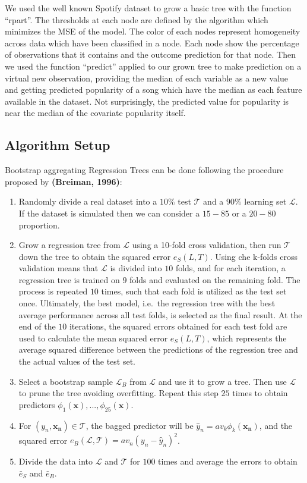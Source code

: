 \documentclass[
]{article}
\begin{document}
We used the well known Spotify dataset to grow a basic tree with the
function ``rpart''. The thresholds at each node are defined by the
algorithm which minimizes the MSE of the model. The color of each nodes
represent homogeneity across data which have been classified in a node.
Each node show the percentage of observations that it contains and the
outcome prediction for that node. Then we used the function ``predict''
applied to our grown tree to make prediction on a virtual new
observation, providing the median of each variable as a new value and
getting predicted popularity of a song which have the median as each
feature available in the dataset. Not surprisingly, the predicted value
for popularity is near the median of the covariate popularity itself.

\hypertarget{algorithm-setup}{%
\subsection{Algorithm Setup}\label{algorithm-setup}}

Bootstrap aggregating Regression Trees can be done following the
procedure proposed by \textbf{(Breiman, 1996)}:

\begin{enumerate}
\def\labelenumi{\arabic{enumi}.}
\item
  Randomly divide a real dataset into a \(10\%\) test \(\mathcal{T}\)
  and a \(90\%\) learning set \(\mathcal{L}\). If the dataset is
  simulated then we can consider a \(15-85\) or a \(20-80\) proportion.
\item
  Grow a regression tree from \(\mathcal{L}\) using a 10-fold cross
  validation, then run \(\mathcal{T}\) down the tree to obtain the
  squared error \(e_S(L, T)\). Using che k-folds cross validation means
  that \(\mathcal{L}\) is divided into \(10\) folds, and for each
  iteration, a regression tree is trained on \(9\) folds and evaluated
  on the remaining fold. The process is repeated \(10\) times, such that
  each fold is utilized as the test set once. Ultimately, the best
  model, i.e.~the regression tree with the best average performance
  across all test folds, is selected as the final result. At the end of
  the \(10\) iterations, the squared errors obtained for each test fold
  are used to calculate the mean squared error \(e_S(L, T)\), which
  represents the average squared difference between the predictions of
  the regression tree and the actual values of the test set.
\item
  Select a bootstrap sample \(\mathcal{L}_B\) from \(\mathcal{L}\) and
  use it to grow a tree. Then use \(\mathcal{L}\) to prune the tree
  avoiding overfitting. Repeat this step \(25\) times to obtain
  predictors \(\phi_1(\mathbf{x}), ..., \phi_{25}(\mathbf{x})\).
\item
  For \((y_n,\mathbf{x_n}) \in \mathcal{T}\), the bagged predictor will
  be \(\hat{y}_n = av_k\phi_k(\mathbf{x_n})\), and the squared error
  \(e_B(\mathcal{L,T})= av_n(y_n - \hat{y}_n)^2\).
\item
  Divide the data into \(\mathcal{L}\) and \(\mathcal{T}\) for \(100\)
  times and average the errors to obtain \(\bar{e}_S\) and
  \(\bar{e}_B\).
\end{enumerate}
\end{document}
